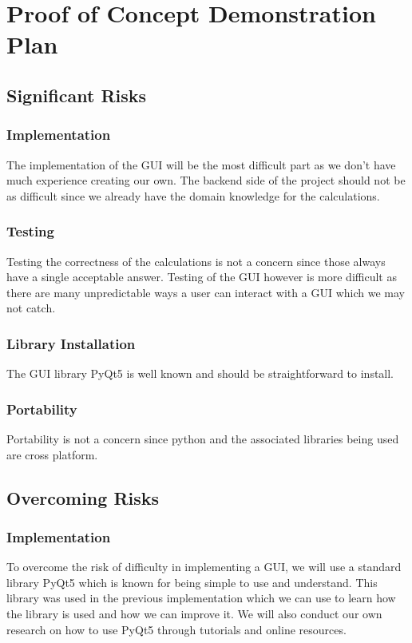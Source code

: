 \documentclass{article}
\begin{document}
\section{Proof of Concept Demonstration Plan}
\subsection{Significant Risks}
\subsubsection{Implementation}
The implementation of the GUI will be the most difficult part as we don’t have much experience creating our own. The backend side of the project should not be as difficult since we already have the domain knowledge for the calculations.

\subsubsection{Testing}
Testing the correctness of the calculations is not a concern since those always have a single acceptable answer. Testing of the GUI however is more difficult as there are many unpredictable ways a user can interact with a GUI which we may not catch.

\subsubsection{Library Installation}
The GUI library PyQt5 is well known and should be straightforward to install.

\subsubsection{Portability}
Portability is not a concern since python and the associated libraries being used are cross platform.


\subsection{Overcoming Risks}
\subsubsection{Implementation}
To overcome the risk of difficulty in implementing a GUI, we will use a standard library PyQt5 which is known for being simple to use and understand. This library was used in the previous implementation which we can use to learn how the library is used and how we can improve it. We will also conduct our own research on how to use PyQt5 through tutorials and online resources.
\end{document}
